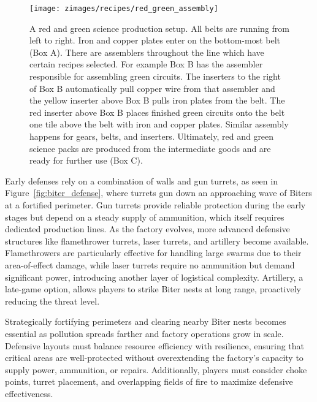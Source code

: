 \begin{figure*}[htb]
    \centering
    \texttt{[image: zimages/recipes/red\_green\_assembly]}
    \caption{A red and green science production setup. All belts are running from left to right. Iron and copper plates enter on the bottom-most belt (Box A). There are assemblers throughout the line which have certain recipes selected. For example Box B has the assembler responsible for assembling green circuits. The inserters to the right of Box B automatically pull copper wire from that assembler and the yellow inserter above Box B pulls iron plates from the belt. The red inserter above Box B places finished green circuits onto the belt one tile above the belt with iron and copper plates. Similar assembly happens for gears, belts, and inserters. Ultimately, red and green science packs are produced from the intermediate goods and are ready for further use (Box C).}
    \label{fig:red_green_assembly}
\end{figure*}

Early defenses rely on a combination of walls and gun turrets, as seen in Figure~\ref{fig:biter_defense}, where turrets gun down an approaching wave of Biters at a fortified perimeter. Gun turrets provide reliable protection during the early stages but depend on a steady supply of ammunition, which itself requires dedicated production lines. As the factory evolves, more advanced defensive structures like flamethrower turrets, laser turrets, and artillery become available. Flamethrowers are particularly effective for handling large swarms due to their area-of-effect damage, while laser turrets require no ammunition but demand significant power, introducing another layer of logistical complexity. Artillery, a late-game option, allows players to strike Biter nests at long range, proactively reducing the threat level.



Strategically fortifying perimeters and clearing nearby Biter nests becomes essential as pollution spreads farther and factory operations grow in scale. Defensive layouts must balance resource efficiency with resilience, ensuring that critical areas are well-protected without overextending the factory’s capacity to supply power, ammunition, or repairs. Additionally, players must consider choke points, turret placement, and overlapping fields of fire to maximize defensive effectiveness.

